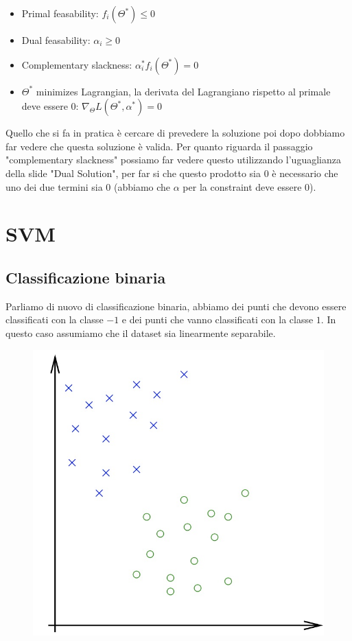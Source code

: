 \documentclass[14pt]{extreport}
\begin{document}
\begin{itemize}
\item Primal feasability: $f_i(\Theta^*) \leq 0$
\item Dual feasability: $\alpha_i \geq 0$
\item Complementary slackness: $\alpha_i^*f_i(\Theta^*) = 0$
\item $\Theta^*$ minimizes Lagrangian, la derivata del Lagrangiano rispetto al primale deve essere 0: $\nabla_\Theta L(\Theta^*, \alpha^*) = 0$
\end{itemize}

Quello che si fa in pratica è cercare di prevedere la soluzione poi dopo dobbiamo far vedere che questa soluzione è valida. Per quanto riguarda il
passaggio "complementary slackness" possiamo far vedere questo utilizzando l'uguaglianza della slide "Dual Solution", per far si che questo prodotto
sia 0 è necessario che uno dei due termini sia 0 (abbiamo che $\alpha$ per la constraint deve essere 0).


\chapter{SVM}

\section{Classificazione binaria}

Parliamo di nuovo di classificazione binaria, abbiamo dei punti che devono essere classificati con la classe $-1$ e dei punti che vanno classificati
con la classe $1$. In questo caso assumiamo che il dataset sia linearmente separabile.
\begin{figure}[H]
\centering
\includegraphics[width=0.4\linewidth]{310.jpeg}
\end{figure}
\end{document}
